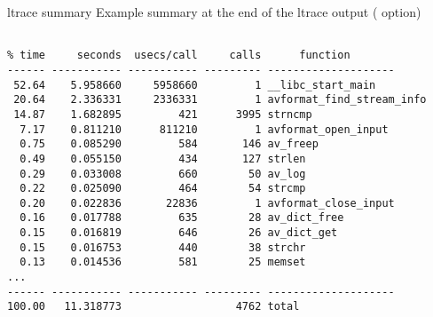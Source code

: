 \begin{frame}[fragile]{ltrace summary}
  Example summary at the end of the ltrace output ( option)
  \scriptsize
  \begin{block}{}
\begin{verbatim}

% time     seconds  usecs/call     calls      function
------ ----------- ----------- --------- --------------------
 52.64    5.958660     5958660         1 __libc_start_main
 20.64    2.336331     2336331         1 avformat_find_stream_info
 14.87    1.682895         421      3995 strncmp
  7.17    0.811210      811210         1 avformat_open_input
  0.75    0.085290         584       146 av_freep
  0.49    0.055150         434       127 strlen
  0.29    0.033008         660        50 av_log
  0.22    0.025090         464        54 strcmp
  0.20    0.022836       22836         1 avformat_close_input
  0.16    0.017788         635        28 av_dict_free
  0.15    0.016819         646        26 av_dict_get
  0.15    0.016753         440        38 strchr
  0.13    0.014536         581        25 memset
...
------ ----------- ----------- --------- --------------------
100.00   11.318773                  4762 total
\end{verbatim}
  \end{block}
\end{frame}
